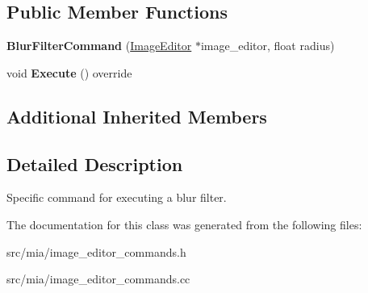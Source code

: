 \subsection*{Public Member Functions}
\begin{DoxyCompactItemize}
\item 
\mbox{\label{classimage__tools_1_1BlurFilterCommand_a20f12622e336a6ede53a169fb62882c6}} 
{\bfseries Blur\+Filter\+Command} (\hyperlink{classimage__tools_1_1ImageEditor}{Image\+Editor} $\ast$image\+\_\+editor, float radius)
\item 
\mbox{\label{classimage__tools_1_1BlurFilterCommand_a14974e1b3c6eb5a810d0fe872a4f4a20}} 
void {\bfseries Execute} () override
\end{DoxyCompactItemize}
\subsection*{Additional Inherited Members}


\subsection{Detailed Description}
Specific command for executing a blur filter. 

The documentation for this class was generated from the following files\+:\begin{DoxyCompactItemize}
\item 
src/mia/image\+\_\+editor\+\_\+commands.\+h\item 
src/mia/image\+\_\+editor\+\_\+commands.\+cc\end{DoxyCompactItemize}
